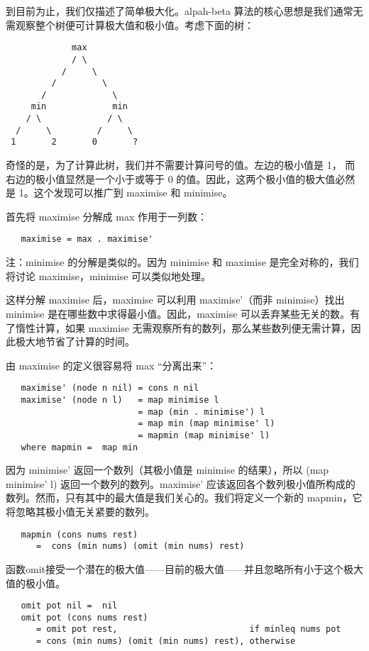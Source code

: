 \documentclass[12pt,a4paper]{article}
\begin{document}
到目前为止，我们仅描述了简单极大化。alpah-beta 算法的核心思想是我们通常无需观察整个树便可计算极大值和极小值。考虑下面的树：

\begin{verbatim}
             max
             / \
           /     \
         /         \
       /             \
     min             min
    / \             / \
  /     \         /     \
 1       2       0       ?
\end{verbatim}

奇怪的是，为了计算此树，我们并不需要计算问号的值。左边的极小值是 1， 而右边的极小值显然是一个小于或等于 0 的值。因此，这两个极小值的极大值必然是 1。这个发现可以推广到 maximise 和 minimise。

首先将 maximise 分解成 max 作用于一列数：
\begin{verbatim}
   maximise = max . maximise'
\end{verbatim}

注：minimise 的分解是类似的。因为 minimise 和 maximise 是完全对称的，我们将讨论 maximise，minimise 可以类似地处理。

这样分解 maximise 后，maximise 可以利用 maximise'（而非 minimise）找出 minimise 是在哪些数中求得最小值。因此，maximise 可以丢弃某些无关的数。有了惰性计算，如果 maximise 无需观察所有的数列，那么某些数列便无需计算，因此极大地节省了计算的时间。

由 maximise 的定义很容易将 max ``分离出来''：

\begin{verbatim}
   maximise' (node n nil) = cons n nil
   maximise' (node n l)   = map minimise l
                          = map (min . minimise') l
                          = map min (map minimise' l)
                          = mapmin (map minimise' l)
   where mapmin =  map min
\end{verbatim}

因为 minimise' 返回一个数列（其极小值是 minimise 的结果），所以 (map minimise' l) 返回一个数列的数列。maximise' 应该返回各个数列极小值所构成的数列。然而，只有其中的最大值是我们关心的。我们将定义一个新的 mapmin，它将忽略其极小值无关紧要的数列。

\begin{verbatim}
   mapmin (cons nums rest)
      =  cons (min nums) (omit (min nums) rest)
\end{verbatim}

函数omit接受一个潜在的极大值——目前的极大值——并且忽略所有小于这个极大值的极小值。
\begin{verbatim}
   omit pot nil =  nil
   omit pot (cons nums rest)
      = omit pot rest,                          if minleq nums pot
      = cons (min nums) (omit (min nums) rest), otherwise
\end{verbatim}
\end{document}
